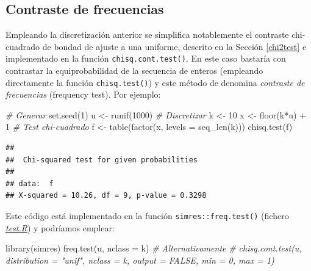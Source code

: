 \documentclass[
]{book}
\newenvironment{Shaded}{\begin{snugshade}}{\end{snugshade}}
\newcommand{\AttributeTok}[1]{\textcolor[rgb]{0.77,0.63,0.00}{#1}}
\newcommand{\CommentTok}[1]{\textcolor[rgb]{0.56,0.35,0.01}{\textit{#1}}}
\newcommand{\DecValTok}[1]{\textcolor[rgb]{0.00,0.00,0.81}{#1}}
\newcommand{\FunctionTok}[1]{\textcolor[rgb]{0.00,0.00,0.00}{#1}}
\newcommand{\NormalTok}[1]{#1}
\newcommand{\OtherTok}[1]{\textcolor[rgb]{0.56,0.35,0.01}{#1}}
\newcommand{\SpecialCharTok}[1]{\textcolor[rgb]{0.00,0.00,0.00}{#1}}
\theoremstyle{break}
\theoremstyle{nonumberplain}
\begin{document}
\hypertarget{freq-test}{%
\subsection{Contraste de frecuencias}\label{freq-test}}

Empleando la discretización anterior se simplifica notablemente el contraste chi-cuadrado de bondad de ajuste a una uniforme, descrito en la Sección \ref{chi2test} e implementado en la función \texttt{chisq.cont.test()}.
En este caso bastaría con contrastar la equiprobabilidad de la secuencia de enteros (empleando directamente la función \texttt{chisq.test()}) y este método de denomina \emph{contraste de frecuencias} (frequency test).
Por ejemplo:

\begin{Shaded}
\begin{Highlighting}[]
\CommentTok{\# Generar}
\FunctionTok{set.seed}\NormalTok{(}\DecValTok{1}\NormalTok{)}
\NormalTok{u }\OtherTok{\textless{}{-}} \FunctionTok{runif}\NormalTok{(}\DecValTok{1000}\NormalTok{)}
\CommentTok{\# Discretizar}
\NormalTok{k }\OtherTok{\textless{}{-}} \DecValTok{10}
\NormalTok{x }\OtherTok{\textless{}{-}} \FunctionTok{floor}\NormalTok{(k}\SpecialCharTok{*}\NormalTok{u) }\SpecialCharTok{+} \DecValTok{1}
\CommentTok{\# Test chi{-}cuadrado}
\NormalTok{f }\OtherTok{\textless{}{-}} \FunctionTok{table}\NormalTok{(}\FunctionTok{factor}\NormalTok{(x, }\AttributeTok{levels =} \FunctionTok{seq\_len}\NormalTok{(k)))}
\FunctionTok{chisq.test}\NormalTok{(f)}
\end{Highlighting}
\end{Shaded}

\begin{verbatim}
## 
##  Chi-squared test for given probabilities
## 
## data:  f
## X-squared = 10.26, df = 9, p-value = 0.3298
\end{verbatim}

Este código está implementado en la función \texttt{simres::freq.test()} (fichero \href{R/test.R}{\emph{test.R}}) y podríamos emplear:

\begin{Shaded}
\begin{Highlighting}[]
\FunctionTok{library}\NormalTok{(simres)}
\FunctionTok{freq.test}\NormalTok{(u, }\AttributeTok{nclass =}\NormalTok{ k)}
\CommentTok{\# Alternativamente}
\CommentTok{\# chisq.cont.test(u, distribution = "unif", nclass = k, output = FALSE, min = 0, max = 1)}
\end{Highlighting}
\end{Shaded}
\end{document}

